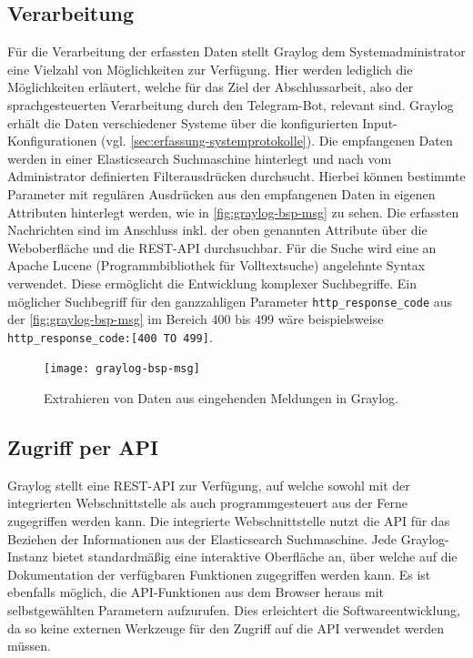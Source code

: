 \subsection{Verarbeitung}

Für die Verarbeitung der erfassten Daten stellt Graylog dem Systemadministrator eine Vielzahl von Möglichkeiten zur Verfügung. Hier werden lediglich die Möglichkeiten erläutert, welche für das Ziel der Abschlussarbeit, also der sprachgesteuerten Verarbeitung durch den Telegram-Bot, relevant sind. Graylog erhält die Daten verschiedener Systeme über die konfigurierten Input-Konfigurationen (vgl. \autoref{sec:erfassung-systemprotokolle}). Die empfangenen Daten werden in einer Elasticsearch Suchmaschine hinterlegt und nach vom Administrator definierten Filterausdrücken durchsucht. Hierbei können bestimmte Parameter mit regulären Ausdrücken aus den empfangenen Daten in eigenen Attributen hinterlegt werden, wie in \autoref{fig:graylog-bsp-msg} zu sehen. Die erfassten Nachrichten sind im Anschluss inkl. der oben genannten Attribute über die Weboberfläche und die REST-API durchsuchbar. Für die Suche wird eine an Apache Lucene (Programmbibliothek für Volltextsuche) angelehnte Syntax verwendet. Diese ermöglicht die Entwicklung komplexer Suchbegriffe. Ein möglicher Suchbegriff für den ganzzahligen Parameter \lstinline{http_response_code} aus der \autoref{fig:graylog-bsp-msg} im Bereich 400 bis 499 wäre beispielsweise \lstinline{http_response_code:[400 TO 499]}. 

\begin{figure}[h!]
\centering
\texttt{[image: graylog-bsp-msg]}
\caption{Extrahieren von Daten aus eingehenden Meldungen in Graylog.}
\label{fig:graylog-bsp-msg}
\end{figure}

\subsection{Zugriff per API}

Graylog stellt eine REST-API zur Verfügung, auf welche sowohl mit der integrierten Webschnittstelle als auch programmgesteuert aus der Ferne zugegriffen werden kann. Die integrierte Webschnittstelle nutzt die API für das Beziehen der Informationen aus der Elasticsearch Suchmaschine. Jede Graylog-Instanz bietet standardmäßig eine interaktive Oberfläche an, über welche auf die Dokumentation der verfügbaren Funktionen zugegriffen werden kann. Es ist ebenfalls möglich, die API-Funktionen aus dem Browser heraus mit selbstgewählten Parametern aufzurufen. Dies erleichtert die Softwareentwicklung, da so keine externen Werkzeuge für den Zugriff auf die API verwendet werden müssen.

